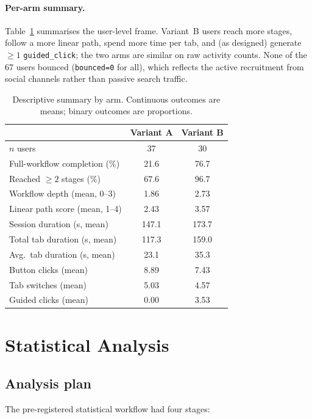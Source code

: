 \documentclass[11pt,a4paper]{article}
\begin{document}
\paragraph{Per-arm summary.}
Table~\ref{tab:desc} summarises the user-level frame.
Variant~B users reach more stages, follow a more linear path,
spend more time per tab, and (as designed) generate $\geq 1$
\texttt{guided\_click}; the two arms are similar on raw activity
counts. None of the 67 users bounced (\texttt{bounced=0} for
all), which reflects the active recruitment from social channels
rather than passive search traffic.

\begin{table}[ht]
\centering\small
\renewcommand{\arraystretch}{1.15}
\caption{Descriptive summary by arm. Continuous outcomes are
means; binary outcomes are proportions.}
\label{tab:desc}
\begin{tabular}{@{}lcc@{}}
\toprule
 & \textbf{Variant A} & \textbf{Variant B} \\
\midrule
$n$ users                            & 37    & 30    \\
Full-workflow completion (\%)        & 21.6  & 76.7  \\
Reached $\geq 2$ stages (\%)         & 67.6  & 96.7  \\
Workflow depth (mean, 0--3)          & 1.86  & 2.73  \\
Linear path score (mean, 1--4)       & 2.43  & 3.57  \\
Session duration (s, mean)           & 147.1 & 173.7 \\
Total tab duration (s, mean)         & 117.3 & 159.0 \\
Avg.\ tab duration (s, mean)         & 23.1  & 35.3  \\
Button clicks (mean)                 & 8.89  & 7.43  \\
Tab switches (mean)                  & 5.03  & 4.57  \\
Guided clicks (mean)                 & 0.00  & 3.53  \\
\bottomrule
\end{tabular}
\end{table}

\section{Statistical Analysis}
\label{sec:stat}

\subsection{Analysis plan}
The pre-registered statistical workflow had four stages:
\end{document}
